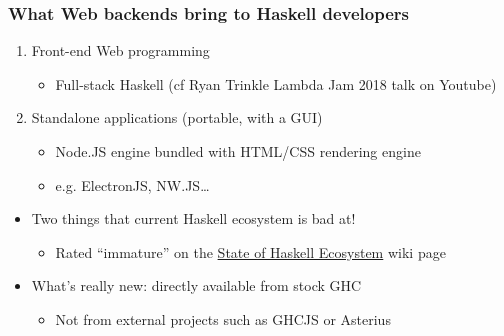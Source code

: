 \documentclass[aspectratio=169]{beamer}
\begin{document}
\begin{frame}
\frametitle{What Web backends bring to Haskell developers}
\begin{enumerate}
\item Front-end Web programming
\begin{itemize}
  \item Full-stack Haskell (cf Ryan Trinkle Lambda Jam 2018 talk on Youtube)
\end{itemize}
\item Standalone applications (portable, with a GUI)
\begin{itemize}
\item Node.JS engine bundled with HTML/CSS rendering engine
\item e.g. ElectronJS, NW.JS…
\end{itemize}
\end{enumerate}

\hspace{1cm}

\begin{itemize}
\item Two things that current Haskell ecosystem is bad at!
\begin{itemize}
\item Rated “immature” on the
\href{https://github.com/Gabriella439/post-rfc/blob/main/sotu.md}{State of Haskell Ecosystem} wiki page
\end{itemize}
\end{itemize}
\hspace{1cm}
\begin{itemize}
\item What’s really new: directly available from stock GHC
\begin{itemize}
\item Not from external projects such as GHCJS or Asterius
\end{itemize}
\end{itemize}
\end{frame}
\end{document}
